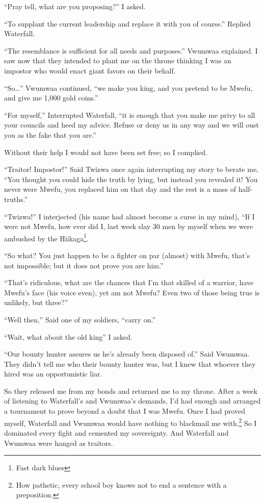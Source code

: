 ``Pray tell, what are you proposing?'' I asked.

``To supplant the current leadership and replace it with you of course.'' Replied Waterfall.

``The resemblance is sufficient for all needs and purposes.'' Vwumwaa explained. I saw now that they intended to plant me on the throne thinking I was an impostor who would enact giant favors on their behalf.

``So\ldots'' Vwumwaa continued, ``we make you king, and you pretend to be Mwefu, and give me 1,000 gold coins.''

``For myself,'' Interrupted Waterfall, ``it is enough that you make me privy to all your councils and heed my advice. Refuse or deny us in any way and we will oust you as the fake that you are.''

Without their help I would not have been set free; so I complied.

\tbreak

``Traitor! Impostor!'' Said Twizwa once again interrupting my story to berate me, ``You thought you could hide the truth by lying, but instead you revealed it! You never were Mwefu, you replaced him on that day and the rest is a mass of half-truths.''

``Twizwa!'' I interjected (his name had almost become a curse in my mind), ``If I were not Mwefu, how ever did I, last week slay 30 men by myself when we were ambushed by the Hiikaga\footnote{Fast dark blues}.

``So what? You just happen to be a fighter on par (almost) with Mwefu, that's not impossible; but it does not prove you are him.''

``That's ridiculous, what are the chances that I'm that skilled of a warrior, have Mwefu's face (his voice even), yet am not Mwefu? Even two of those being true is unlikely, but three?''

``Well then,'' Said one of my soldiers, ``carry on.''

\tbreak

``Wait, what about the old king'' I asked.

``Our bounty hunter assures us he's already been disposed of.'' Said Vwumwaa. They didn't tell me who their bounty hunter was, but I knew that whoever they hired was an opportunistic liar.

So they released me from my bonds and returned me to my throne. After a week of listening to Waterfall's and Vwumwaa's demands, I'd had enough and arranged a tournament to prove beyond a doubt that I was Mwefu. Once I had proved myself, Waterfall and Vwumwaa would have nothing to blackmail me with.\footnote{How pathetic, every school boy knows not to end a sentence with a preposition.} So I dominated every fight and cemented my sovereignty. And Waterfall and Vwumwaa were hanged as traitors.

